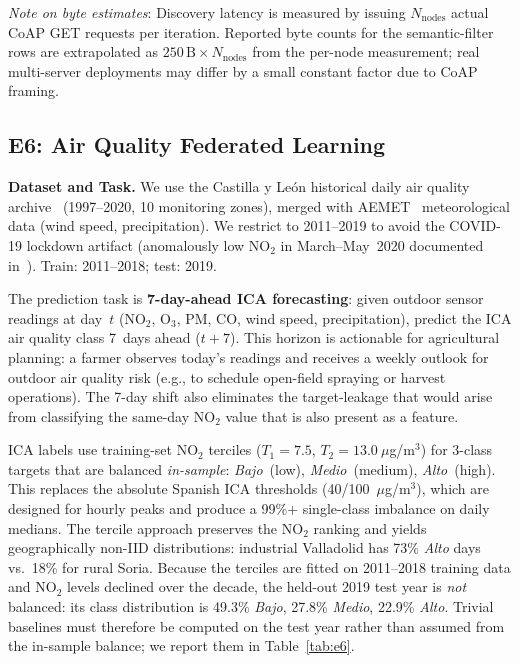 ﻿\documentclass[journal]{IEEEtran}
\begin{document}
\emph{Note on byte estimates}: Discovery latency is measured by issuing $N_\text{nodes}$ actual CoAP GET requests per iteration. Reported byte counts for the semantic-filter rows are extrapolated as $250\,\text{B} \times N_\text{nodes}$ from the per-node measurement; real multi-server deployments may differ by a small constant factor due to CoAP framing.

\subsection{E6: Air Quality Federated Learning}
\label{sec:e6}

\textbf{Dataset and Task.} We use the Castilla y Le\'on historical daily air quality archive~\cite{cyl2023airquality} (1997--2020, 10 monitoring zones), merged with AEMET~\cite{aemet2023} meteorological data (wind speed, precipitation). We restrict to 2011--2019 to avoid the COVID-19 lockdown artifact (anomalously low NO$_2$ in March--May~2020 documented in~\cite{lopezblanco2024airquality}). Train: 2011--2018; test: 2019.

The prediction task is \textbf{7-day-ahead ICA forecasting}: given outdoor sensor readings at day~$t$ (NO$_2$, O$_3$, PM, CO, wind speed, precipitation), predict the ICA air quality class 7~days ahead ($t{+}7$). This horizon is actionable for agricultural planning: a farmer observes today's readings and receives a weekly outlook for outdoor air quality risk (e.g., to schedule open-field spraying or harvest operations). The 7-day shift also eliminates the target-leakage that would arise from classifying the same-day NO$_2$ value that is also present as a feature.

ICA labels use training-set NO$_2$ terciles ($T_1{=}7.5$, $T_2{=}13.0~\mu$g/m$^3$) for 3-class targets that are balanced \emph{in-sample}: \textit{Bajo}~(low), \textit{Medio}~(medium), \textit{Alto}~(high). This replaces the absolute Spanish ICA thresholds (40/100~$\mu$g/m$^3$), which are designed for hourly peaks and produce a 99\%+ single-class imbalance on daily medians. The tercile approach preserves the NO$_2$ ranking and yields geographically non-IID distributions: industrial Valladolid has 73\% \textit{Alto} days vs.\ 18\% for rural Soria. Because the terciles are fitted on 2011--2018 training data and NO$_2$ levels declined over the decade, the held-out 2019 test year is \emph{not} balanced: its class distribution is 49.3\% \textit{Bajo}, 27.8\% \textit{Medio}, 22.9\% \textit{Alto}. Trivial baselines must therefore be computed on the test year rather than assumed from the in-sample balance; we report them in Table~\ref{tab:e6}.
\end{document}
